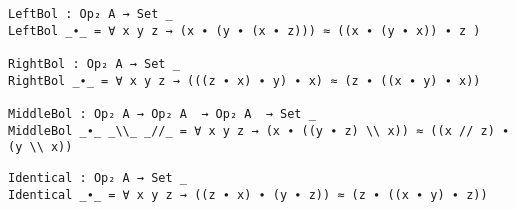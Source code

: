 \begin{verbatim}
LeftBol : Op₂ A → Set _
LeftBol _∙_ = ∀ x y z → (x ∙ (y ∙ (x ∙ z))) ≈ ((x ∙ (y ∙ x)) ∙ z )

RightBol : Op₂ A → Set _
RightBol _∙_ = ∀ x y z → (((z ∙ x) ∙ y) ∙ x) ≈ (z ∙ ((x ∙ y) ∙ x))

MiddleBol : Op₂ A → Op₂ A  → Op₂ A  → Set _
MiddleBol _∙_ _\\_ _//_ = ∀ x y z → (x ∙ ((y ∙ z) \\ x)) ≈ ((x // z) ∙ (y \\ x))
\end{verbatim}
\begin{verbatim}
Identical : Op₂ A → Set _
Identical _∙_ = ∀ x y z → ((z ∙ x) ∙ (y ∙ z)) ≈ (z ∙ ((x ∙ y) ∙ z))
\end{verbatim}

